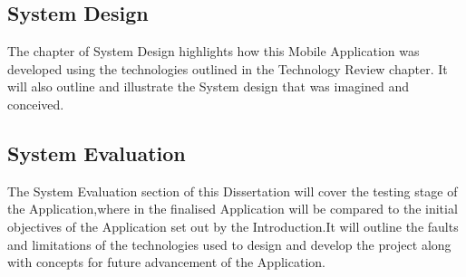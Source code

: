 \subsection{System Design}
The chapter of System Design highlights how this Mobile Application was developed using the technologies outlined in the Technology Review chapter. It will also outline and illustrate the System design that was imagined and conceived.
\subsection{System Evaluation}
The System Evaluation section of this Dissertation will cover the testing stage of the Application,where in the finalised Application will be compared to the initial objectives of the Application set out by the Introduction.It will outline the faults and limitations of the technologies used to design and develop the project along with concepts for future advancement of the Application.  

